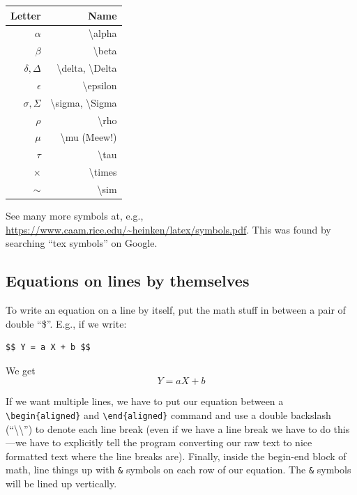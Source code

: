 \documentclass[
  letterpaper,
  DIV=11,
  numbers=noendperiod]{scrreprt}
\begin{document}
\begin{longtable}[]{@{}rr@{}}
\toprule\noalign{}
Letter & Name \\
\midrule\noalign{}
\endhead
\bottomrule\noalign{}
\endlastfoot
\(\alpha\) & \textbackslash alpha \\
\(\beta\) & \textbackslash beta \\
\(\delta, \Delta\) & \textbackslash delta, \textbackslash Delta \\
\(\epsilon\) & \textbackslash epsilon \\
\(\sigma, \Sigma\) & \textbackslash sigma, \textbackslash Sigma \\
\(\rho\) & \textbackslash rho \\
\(\mu\) & \textbackslash mu (Meew!) \\
\(\tau\) & \textbackslash tau \\
\(\times\) & \textbackslash times \\
\(\sim\) & \textbackslash sim \\
\end{longtable}

See many more symbols at, e.g.,
\url{https://www.caam.rice.edu/~heinken/latex/symbols.pdf}. This was
found by searching ``tex symbols'' on Google.

\hypertarget{equations-on-lines-by-themselves}{%
\subsection{Equations on lines by
themselves}\label{equations-on-lines-by-themselves}}

To write an equation on a line by itself, put the math stuff in between
a pair of double ``\$''. E.g., if we write:

\begin{verbatim}
$$ Y = a X + b $$
\end{verbatim}

We get \[ Y = a X + b \]

If we want multiple lines, we have to put our equation between a
\texttt{\textbackslash{}begin\{aligned\}} and
\texttt{\textbackslash{}end\{aligned\}} command and use a double
backslash (``\textbackslash\textbackslash{}'') to denote each line break
(even if we have a line break we have to do this---we have to explicitly
tell the program converting our raw text to nice formatted text where
the line breaks are). Finally, inside the begin-end block of math, line
things up with \texttt{\&} symbols on each row of our equation. The
\texttt{\&} symbols will be lined up vertically.
\end{document}
